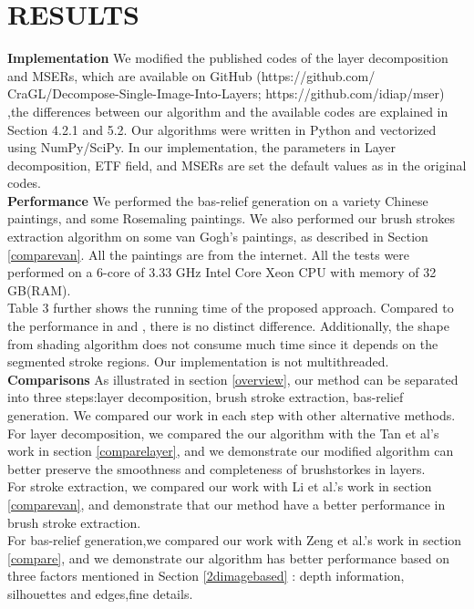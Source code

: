 \chapter{RESULTS}\label{result}

\textbf{Implementation}  We modified the published codes of the layer decomposition and MSERs, which are available on GitHub (https://github.com/ CraGL/Decompose-Single-Image-Into-Layers; https://github.com/idiap/mser) ,the differences between our algorithm and the available codes are explained in Section 4.2.1 and 5.2. Our algorithms were written in Python and vectorized using NumPy/SciPy. In our implementation, the parameters in Layer decomposition, ETF field, and MSERs are set the default values as in the original codes.\\ 
\textbf{Performance}  We performed the bas-relief generation on a variety Chinese paintings, and some Rosemaling paintings. We also performed our brush strokes extraction algorithm on some van Gogh's paintings, as described in Section \ref{comparevan}. All the paintings are from the internet.  All the tests were performed on a 6-core of 3.33 GHz Intel Core Xeon CPU with memory of 32 GB(RAM).\\
Table 3 further shows the running time of the proposed approach. Compared to the performance in \cite{tan2016decomposing} and \cite{nister2008linear}, there is no distinct difference. Additionally, the shape from shading algorithm does not consume much time since it depends on the segmented stroke regions. Our implementation is not multithreaded. \\
\textbf{Comparisons}  
As illustrated in section \ref{overview}, our method can be separated into three steps:layer decomposition, brush stroke extraction, bas-relief generation. We compared our work in each step with other alternative methods.\\
For layer decomposition, we compared the our algorithm with the Tan et al's work \cite{tan2016decomposing} in section \ref{comparelayer}, and we demonstrate our modified algorithm can better preserve the smoothness and completeness of brushstorkes in layers. \\
For stroke extraction, we compared our work with Li et al.'s work \cite{li2012rhythmic} in section \ref{comparevan}, and demonstrate that our method have a better performance in brush stroke extraction.\\
For bas-relief generation,we compared our work with Zeng et al.'s work \cite{zeng2014region} in section \ref{compare}, and we demonstrate our algorithm has better performance based on three factors mentioned in Section \ref{2dimagebased} : depth information, silhouettes and edges,fine details. \\
